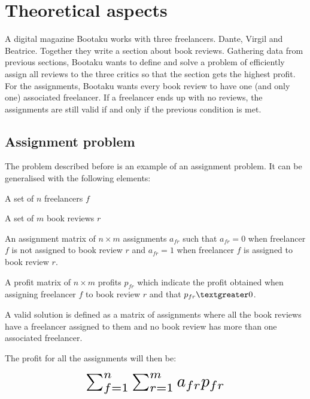 \renewcommand{\documentname}{Theoretical Aspects}

\chapter{Theoretical aspects}\label{theory}

A digital magazine Bootaku works with three freelancers. Dante, Virgil and Beatrice. Together they write a section about book reviews. Gathering data from previous sections, Bootaku wants to define and solve a problem of efficiently assign all reviews to the three critics so that the section gets the highest profit. For the assignments, Bootaku wants every book review to have one (and only one) associated freelancer. If a freelancer ends up with no reviews, the assignments are still valid if and only if the previous condition is met.


\section{Assignment problem}

The problem described before is an example of an assignment problem. It can be generalised with the following elements: 

\begin{description}
    \item A set of $n$ freelancers $f$
    \item A set of $m$ book reviews $r$
    \item An assignment matrix of $n \times m$ assignments $a_{fr}$ such that $a_{fr} = 0$ when freelancer $f$ is not assigned to book review $r$ and $a_{fr} = 1$ when freelancer $f$ is assigned to book review $r$.
    \item A profit matrix of $n \times m$ profits $p_{fr}$ which indicate the profit obtained when assigning freelancer $f$ to book review $r$ and that $p_{fr} \textgreater 0$.
    \item A valid solution is defined as a matrix of assignments where all the book reviews have a freelancer assigned to them and no book review has more than one associated freelancer.
\end{description}

The profit for all the assignments will then be:

\begin{equation}
    \scalebox{2}{$\sum_{f=1}^n \sum_{r=1}^m a_{fr} p_{fr}$}
\end{equation}

